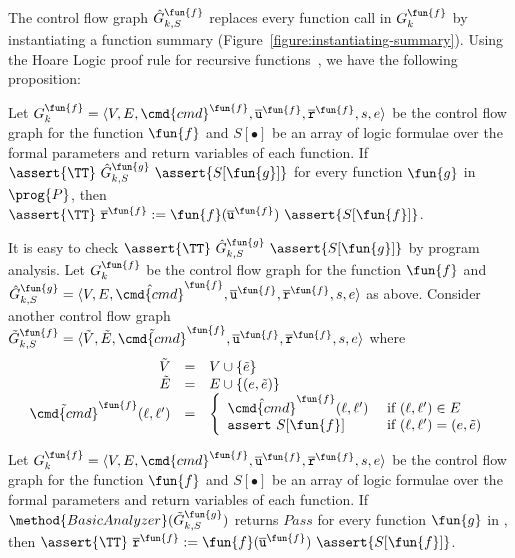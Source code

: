 The control flow graph $\hat{G}^{\fun{f}}_{k,S}$ replaces every
function call in $G_k^\fun{f}$ by instantiating a function
summary (Figure~\ref{figure:instantiating-summary}).
Using the Hoare Logic proof rule for recursive functions~\cite{Oheimb99}, we have the
following proposition:
\begin{proposition}
  \label{proposition:check_summary}
  Let $G^\fun{f}_k = \langle V, E, \cmd{cmd}^\fun{f}, \overline{\mathtt{u}}^\fun{f}, \overline{\mathtt{r}}^\fun{f},s,e \rangle$ be the control flow graph for the function
  $\fun{f}$ and $S[\bullet]$ be an array of logic formulae over the formal
  parameters and return variables of each function. If $\assert{\TT}\
  \hat{G}^\fun{g}_{k,S}\ \assert{S[\fun{g}]}$ for every
  function $\fun{g}$ in $\prog{P}$, then $\assert{\TT}\ \overline{\mathtt{r}}^\fun{f} :=
  \fun{f} (\overline{\mathtt{u}}^\fun{f})\ \assert{S[\fun{f}]}$.
\end{proposition}

It is easy to check $\assert{\TT}\ \hat{G}^\fun{g}_{k,S}\
\assert{S[\fun{g}]}$ by program analysis. Let $G_k^{\fun{f}}$ be
the control flow graph for the function $\fun{f}$ and
$\hat{G}^\fun{g}_{k,S} = \langle V, E, \hat{\cmd{cmd}}^\fun{f}, \overline{\mathtt{u}}^\fun{f}, \overline{\mathtt{r}}^\fun{f},s,e \rangle$ as
above. Consider another control flow graph $\tilde{G}^\fun{f}_{k,S} =
\langle \tilde{V}, \tilde{E}, \tilde{\cmd{cmd}}^\fun{f} , \overline{\mathtt{u}}^\fun{f}, \overline{\mathtt{r}}^\fun{f},s,e \rangle$ where
\begin{equation*}
  \begin{array}{rcl}
    \tilde{V} & = & V \cup \{ \tilde{e} \}\\
    \tilde{E} & = & E \cup \{ (e, \tilde{e}) \}\\
    \tilde{\cmd{cmd}}^\fun{f} (\ell, \ell') & = &
    \left\{
      \begin{array}{ll}
        \hat{\cmd{cmd}}^\fun{f} (\ell, \ell') &
        \text{ if } (\ell, \ell') \in E\\
        \mathtt{assert\ } S[\fun{f}] &
        \text{ if } (\ell, \ell') = (e, \tilde{e})
      \end{array}
    \right.
  \end{array}
\end{equation*}

\begin{corollary}
  Let $G^\fun{f}_k = \langle V, E, \cmd{cmd}^\fun{f}, \overline{\mathtt{u}}^\fun{f}, \overline{\mathtt{r}}^\fun{f},s,e \rangle$ be the control flow graph for the function
  $\fun{f}$ and $S[\bullet]$ be an array of logic formulae over the formal
  parameters and return variables of each function. If $\method{BasicAnalyzer}
  (\tilde{G}^\fun{g}_{k,S})$ returns $\mathit{Pass}$ for every function
  $\fun{g}$ in \prog{P}, then $\assert{\TT}\ \overline{\mathtt{r}}^\fun{f} :=
  \fun{f} (\overline{\mathtt{u}}^\fun{f})\ \assert{S[\fun{f}]}$.
  \label{corollary:check-summary}
\end{corollary}

